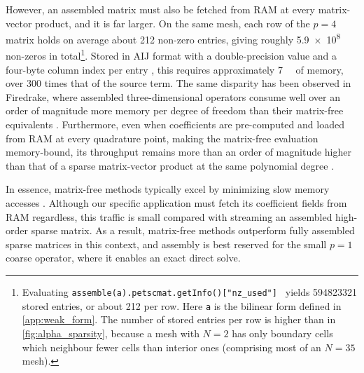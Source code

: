 \documentclass{article}
\begin{document}
However, an assembled matrix must also be fetched from RAM at every matrix-vector product, and it is far larger.
On the same mesh, each row of the $p=4$ matrix holds on average about 212 non-zero entries, giving roughly \num{5.9e8} non-zeros in total\footnote{
Evaluating \texttt{assemble(a).petscmat.getInfo()["nz_used"] } yields \num{594823321} stored entries, or about 212 per row.
Here \texttt{a} is the bilinear form defined in \cref{app:weak_form}.
The number of stored entries per row is higher than in \cref{fig:alpha_sparsity}, because a mesh with $N=2$ has only boundary cells which neighbour fewer cells than interior ones (comprising most of an $N=35$ mesh).
}.
Stored in AIJ format with a double-precision value and a four-byte column index per entry \cite{PETScUserManual}, this requires approximately \qty{7}{\giga\byte} of memory, over 300 times that of the source term.
The same disparity has been observed in Firedrake, where assembled three-dimensional operators consume well over an order of magnitude more memory per degree of freedom than their matrix-free equivalents \cite{KirbyMitchell2018}.
Furthermore, even when coefficients are pre-computed and loaded from RAM at every quadrature point, making the matrix-free evaluation memory-bound, its throughput remains more than an order of magnitude higher than that of a sparse matrix-vector product at the same polynomial degree \cite{Kronbichler2022}.

In essence, matrix-free methods typically excel by minimizing slow memory accesses \cite{Muench2024}.
Although our specific application must fetch its coefficient fields from RAM regardless, this traffic is small compared with streaming an assembled high-order sparse matrix.
As a result, matrix-free methods outperform fully assembled sparse matrices in this context, and assembly is best reserved for the small $p=1$ coarse operator, where it enables an exact direct solve.
\end{document}
